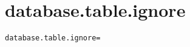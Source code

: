 \section{database.table.ignore}
\label{configuration:DatabaseTableIgnore}
\ClearAPI
\TODO
{}
\begin{lstlisting}[style=Props,caption={Usage example for \textit{database.table.ignore}}]
database.table.ignore=
\end{lstlisting}
